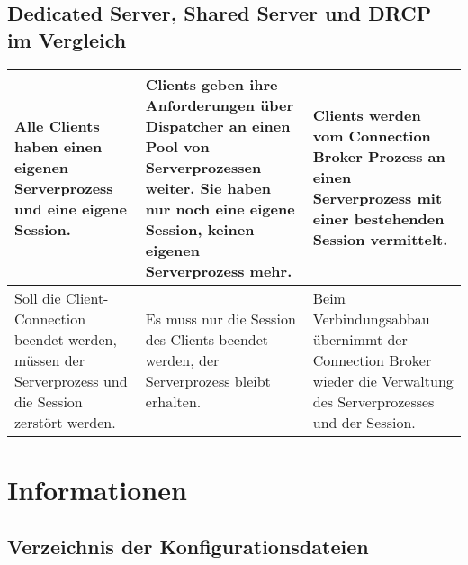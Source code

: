       \subsection{Dedicated Server, Shared Server und DRCP im Vergleich}
        \begin{center}
          \begin{small}
            \tabletail{
              \hline
            }
            \begin{supertabular}[h]{|p{4.9cm}|p{4.9cm}|p{4.9cm}|}
              Alle Clients haben einen eigenen Serverprozess und eine eigene Session.& Clients geben ihre Anforderungen über Dispatcher an einen Pool von Serverprozessen weiter. Sie haben nur noch eine eigene Session, keinen eigenen Serverprozess mehr. & Clients werden vom Connection Broker Prozess an einen Serverprozess mit einer bestehenden Session vermittelt. \\
              \hline
              Soll die Client-Connection beendet werden, müssen der Serverprozess und die Session zerstört werden. & Es muss nur die Session des Clients beendet werden, der Serverprozess bleibt erhalten. & Beim Verbindungsabbau übernimmt der Connection Broker wieder die Verwaltung des Serverprozesses und der Session. \\
              \hline
            \end{supertabular}
          \end{small}
        \end{center}
\clearpage		
    \section{Informationen}
      \subsection{Verzeichnis der Konfigurationsdateien}
        \begin{literaturinternet}
          \item  \cite{NETRF011}
          \item  \cite{NETRF008}
          \item  \cite{NETRF007}
          \item  \cite{NETRF006}
        \end{literaturinternet}
\clearpage
